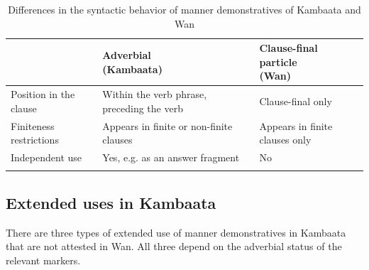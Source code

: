 \documentclass[output=paper,colorlinks,citecolor=brown]{langscibook}
\begin{document}

\begin{table}
\begin{tabularx}{\textwidth}{QQQ}
\lsptoprule
& {Adverbial\newline (Kambaata)} & {Clause-final particle\newline (Wan)}\\
\midrule
{Position in the clause} & {Within the verb phrase, preceding the verb} & {Clause-final only}\\
{Finiteness restrictions} & {Appears in finite or non-finite clauses} & {Appears in finite clauses only}\\
{Independent use} & {Yes, e.g. as an answer fragment} & {No}\\
\lspbottomrule
\end{tabularx}
\caption{Differences in the syntactic behavior of manner demonstratives of Kambaata and Wan}
\label{tab:nikitina:2}
\end{table}

\subsection{Extended uses in Kambaata}\label{sec:nikitina.3.2}


There are three types of extended use of manner demonstratives in Kambaata that are not attested in Wan. All three depend on the adverbial status of the relevant markers.
\end{document}
